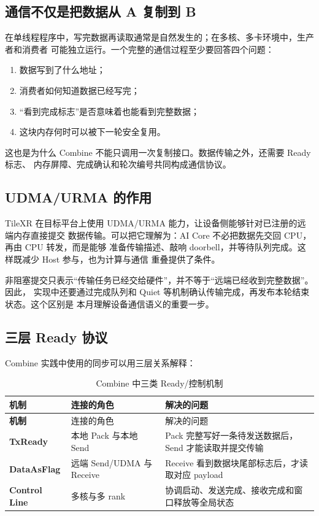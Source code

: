 \documentclass[UTF8,a4paper,11pt]{ctexart}
\begin{document}
\subsection{通信不仅是把数据从 A 复制到 B}

在单线程程序中，写完数据再读取通常是自然发生的；在多核、多卡环境中，生产者和消费者
可能独立运行。一个完整的通信过程至少要回答四个问题：

\begin{enumerate}
  \item 数据写到了什么地址；
  \item 消费者如何知道数据已经写完；
  \item “看到完成标志”是否意味着也能看到完整数据；
  \item 这块内存何时可以被下一轮安全复用。
\end{enumerate}

这也是为什么 Combine 不能只调用一次复制接口。数据传输之外，还需要 Ready 标志、
内存屏障、完成确认和轮次编号共同构成通信协议。

\subsection{UDMA/URMA 的作用}

TileXR 在目标平台上使用 UDMA/URMA 能力，让设备侧能够针对已注册的远端内存直接提交
数据传输。可以把它理解为：AI Core 不必把数据先交回 CPU，再由 CPU 转发，而是能够
准备传输描述、敲响 doorbell，并等待队列完成。这样既减少 Host 参与，也为计算与通信
重叠提供了条件。

非阻塞提交只表示“传输任务已经交给硬件”，并不等于“远端已经收到完整数据”。因此，
实现中还要通过完成队列和 Quiet 等机制确认传输完成，再发布本轮结束状态。这个区别是
本月理解设备通信语义的重要一步。

\subsection{三层 Ready 协议}

Combine 实践中使用的同步可以用三层关系解释：

\begin{longtable}{>{\bfseries}p{}p{}p{}}
  \caption{Combine 中三类 Ready/控制机制}\label{tab:ready}\\
  \toprule
  机制 & 连接的角色 & 解决的问题 \\
  \midrule
  \endfirsthead
  \toprule
  机制 & 连接的角色 & 解决的问题 \\
  \midrule
  \endhead
  TxReady & 本地 Pack 与本地 Send & Pack 完整写好一条待发送数据后，Send 才能读取并提交传输 \\
  DataAsFlag & 远端 Send/UDMA 与 Receive & Receive 看到数据块尾部标志后，才读取对应 payload \\
  Control Line & 多核与多 rank & 协调启动、发送完成、接收完成和窗口释放等全局状态 \\
  \bottomrule
\end{longtable}
\end{document}
